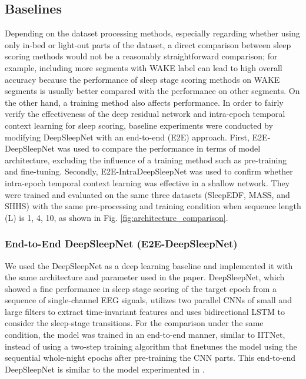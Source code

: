 \documentclass[10pt,twocolumn,twoside]{IEEEtran}
\begin{document}
    \subsection{Baselines}
     Depending on the dataset processing methods, especially regarding whether using only in-bed or light-out parts of the dataset, a direct comparison between sleep scoring methods would not be a reasonably straightforward comparison; for example, including more segments with WAKE label can lead to high overall accuracy because the performance of sleep stage scoring methods on WAKE segments is usually better compared with the performance on other segments. On the other hand, a training method also affects performance. In order to fairly verify the effectiveness of the deep residual network \cite{he2016deep} and intra-epoch temporal context learning for sleep scoring, baseline experiments were conducted by modifying DeepSleepNet with an end-to-end (E2E) approach. First, E2E-DeepSleepNet was used to compare the performance in terms of model architecture, excluding the influence of a training method such as pre-training and fine-tuning. Secondly, E2E-IntraDeepSleepNet was used to confirm whether intra-epoch temporal context learning was effective in a shallow network. They were trained and evaluated on the same three datasets (SleepEDF, MASS, and SHHS) with the same pre-processing and training condition when sequence length (L) is 1, 4, 10, as shown in Fig. \ref{fig:architecture_comparison}. 

    \subsubsection{End-to-End DeepSleepNet (E2E-DeepSleepNet)}
    We used the DeepSleepNet as a deep learning baseline \cite{supratak2017deepsleepnet} and implemented it with the same architecture and parameter used in the paper. DeepSleepNet, which showed a fine performance in sleep stage scoring of the target epoch from a sequence of single-channel EEG signals, utilizes two parallel CNNs of small and large filters to extract time-invariant features and uses bidirectional LSTM to consider the sleep-stage transitions. For the comparison under the same condition, the model was trained in an end-to-end manner, similar to IITNet, instead of using a two-step training algorithm that finetunes the model using the sequential whole-night epochs after pre-training the CNN parts. This end-to-end DeepSleepNet is similar to the model experimented in \cite{phan2019seqsleepnet}.
\end{document}
